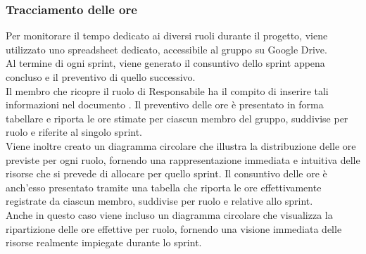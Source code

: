 \subsubsection{Tracciamento delle ore}
Per monitorare il tempo dedicato ai diversi ruoli durante il progetto, viene utilizzato uno spreadsheet dedicato, accessibile al gruppo su Google Drive.\\
Al termine di ogni sprint, viene generato il consuntivo dello sprint appena concluso e il preventivo di quello successivo. \\
Il membro che ricopre il ruolo di Responsabile ha il compito di inserire tali informazioni nel documento .
Il preventivo delle ore è presentato in forma tabellare e riporta le ore stimate per ciascun membro del gruppo, suddivise per ruolo e riferite al singolo sprint.\\
Viene inoltre creato un diagramma circolare che illustra la distribuzione delle ore previste per ogni ruolo, fornendo una rappresentazione immediata e intuitiva delle risorse che si prevede di allocare per quello sprint.
Il consuntivo delle ore è anch’esso presentato tramite una tabella che riporta le ore effettivamente registrate da ciascun membro, suddivise per ruolo e relative allo sprint.\\ 
Anche in questo caso viene incluso un diagramma circolare che visualizza la ripartizione delle ore effettive per ruolo, fornendo una visione immediata delle risorse realmente impiegate durante lo sprint.

